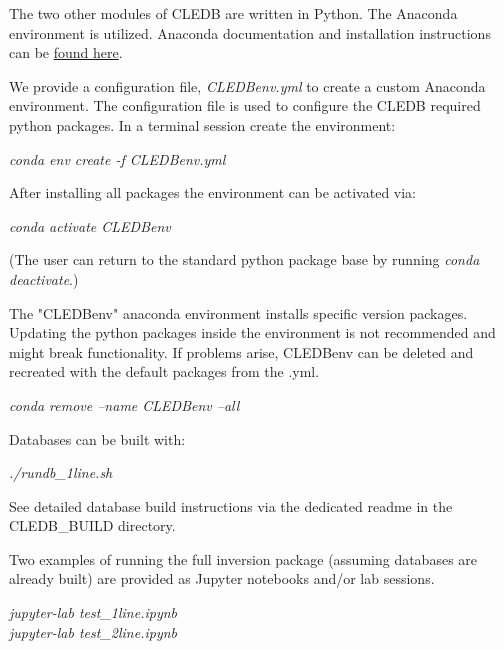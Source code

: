 \documentclass{article}
\begin{document}
The two other modules of CLEDB are written in Python. 
The Anaconda environment is utilized. Anaconda documentation and installation instructions can be \href{https://docs.continuum.io/anaconda/install/}{found here}.

We provide a configuration file, \emph{\color{red}CLEDBenv.yml} to create a custom Anaconda environment. The configuration file is used to configure the CLEDB required python packages. In a terminal session  create the environment:

\emph{\color{red}conda env create -f CLEDBenv.yml}
 
After installing all packages the environment can be activated via:

\emph{\color{red}conda activate CLEDBenv}

(The user can return to the standard python package base by running \emph{\color{red}conda deactivate}.)

The "CLEDBenv" anaconda environment installs specific version packages. Updating the python packages inside the environment is not recommended and might break functionality. If problems arise, CLEDBenv can be deleted and recreated with the default packages from the .yml.

\emph{\color{red}conda remove --name CLEDBenv --all}

Databases can be built with:

\emph{\color{red}./rundb\_1line.sh} 

See detailed database build instructions via the dedicated readme in the CLEDB\_BUILD directory.

Two examples of running the full inversion package (assuming databases are already built) are provided as Jupyter notebooks and/or lab sessions.

\emph{\color{red}jupyter-lab test\_1line.ipynb}\\
\emph{\color{red}jupyter-lab test\_2line.ipynb}
\end{document}
